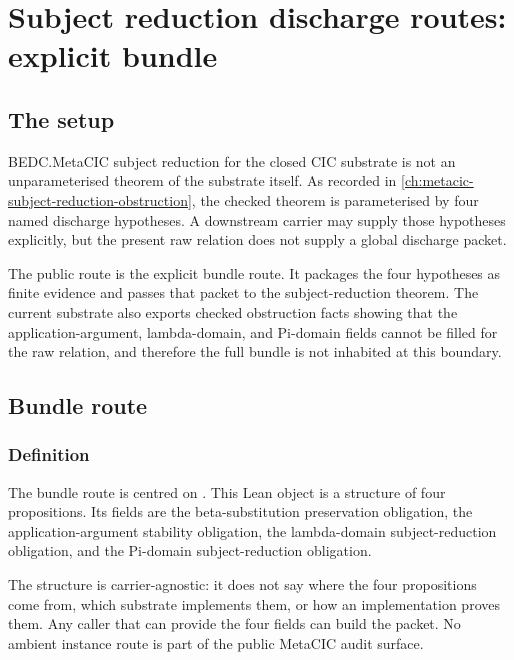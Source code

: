 \chapter{Subject reduction discharge routes: explicit bundle}
\label{ch:sr-discharge-routes}

\section{The setup}
\label{sec:sr-discharge-routes-setup}

BEDC.MetaCIC subject reduction for the closed CIC substrate is not
an unparameterised theorem of the substrate itself.  As recorded in
\autoref{ch:metacic-subject-reduction-obstruction}, the checked theorem
is parameterised by four named discharge hypotheses.  A downstream
carrier may supply those hypotheses explicitly, but the present raw
relation does not supply a global discharge packet.

The public route is the explicit bundle route.  It packages the four
hypotheses as finite evidence and passes that packet to the
subject-reduction theorem.  The current substrate also exports checked
obstruction facts showing that the application-argument, lambda-domain,
and Pi-domain fields cannot be filled for the raw relation, and therefore
the full bundle is not inhabited at this boundary.

\section{Bundle route}
\label{sec:sr-discharge-routes-bundle-route}

\subsection{Definition}
\label{subsec:sr-discharge-routes-bundle-definition}

The bundle route is centred on
.
This Lean object is a structure of four propositions.  Its fields are the
beta-substitution preservation obligation, the application-argument
stability obligation, the lambda-domain subject-reduction obligation, and
the Pi-domain subject-reduction obligation.

The structure is carrier-agnostic: it does not say where the four
propositions come from, which substrate implements them, or how an
implementation proves them.  Any caller that can provide the four fields
can build the packet.  No ambient instance route is part of the public
MetaCIC audit surface.


